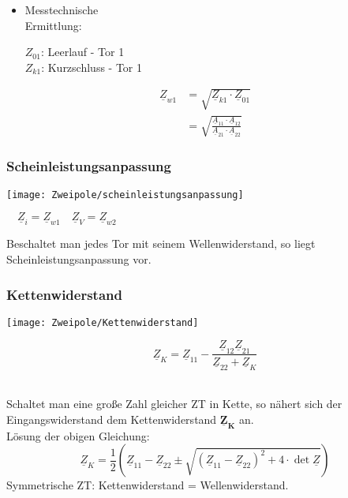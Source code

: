 \begin{minipage}{0.5\columnwidth}
	\small
	\begin{itemize}
	\item[] Messtechnische\\ Ermittlung:
	
	$Z_{01}$: Leerlauf - Tor 1\\
	$Z_{k1}$: Kurzschluss - Tor 1
	\end{itemize}

	\begin{align*}
		\underline{Z}_{w1} &= \sqrt{\underline{Z}_{k1}\cdot\underline{Z}_{01}}\\
		&=\sqrt{\frac{\underline{A}_{11}\cdot\underline{A}_{12}}{\underline{A}_{21}\cdot\underline{A}_{22}}}
	\end{align*}
\end{minipage}

    
\subsubsection{Scheinleistungsanpassung}
\begin{minipage}{0.55\columnwidth}
	\texttt{[image: Zweipole/scheinleistungsanpassung]}
\end{minipage}
\begin{minipage}{0.45\columnwidth}
$\quad \underline{Z}_i = \underline{Z}_{w1} \quad \underline{Z}_V=\underline{Z}_{w2}
$
\end{minipage}

Beschaltet man jedes Tor mit seinem Wellenwiderstand, so liegt Scheinleistungsanpassung vor.

\subsubsection{Kettenwiderstand}
\begin{minipage}{0.5\columnwidth}
	\texttt{[image: Zweipole/Kettenwiderstand]}
\end{minipage}
\begin{minipage}[b]{0.5\columnwidth}
	$$
	\underline{Z}_K = \underline{Z}_{11} - \frac{\underline{Z}_{12}\underline{Z}_{21}}{\underline{Z}_{22}+\underline{Z}_K}
	$$
\end{minipage}
\\
\small
Schaltet man eine große Zahl gleicher ZT in Kette, so nähert sich der Eingangswiderstand dem Kettenwiderstand $\mathbf{\underline{Z}_K}$ an.\\
L\"osung der obigen Gleichung:
\[
    \underline{Z}_K = \frac{1}{2}(\underline{Z}_{11} - \underline{Z}_{22} \pm \sqrt{(\underline{Z}_{11}-\underline{Z}_{22})^2+4\cdot\operatorname{det}\underline{Z}})
\]
Symmetrische ZT: Kettenwiderstand = Wellenwiderstand.
\normalsize
